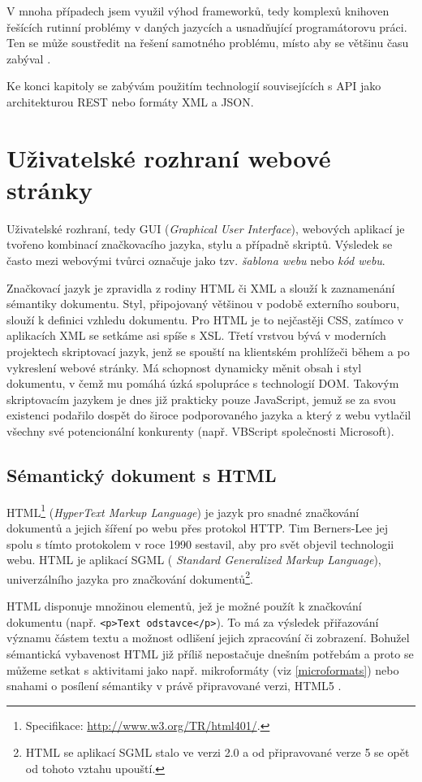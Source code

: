 V mnoha případech jsem využil výhod frameworků, tedy komplexů
knihoven řešících rutinní problémy v daných jazycích a usnadňující
programátorovu práci. Ten se může soustředit na řešení samotného
problému, místo aby se většinu času zabýval .

Ke konci kapitoly se zabývám použitím technologií souvisejících s API
jako architekturou REST nebo formáty XML a JSON.

\section{Uživatelské rozhraní webové stránky}\label{gui}
Uživatelské rozhraní, tedy GUI ({\it Graphical User Interface}),
webových aplikací je tvořeno kombinací značkovacího jazyka, stylu a
případně skriptů. Výsledek se často mezi webovými tvůrci označuje
jako tzv. {\it šablona webu} nebo {\it kód webu}.

Značkovací jazyk je zpravidla z rodiny HTML či XML a slouží k
zaznamenání sémantiky dokumentu. Styl, připojovaný většinou v podobě
externího souboru, slouží k definici vzhledu dokumentu. Pro HTML je
to nejčastěji CSS, zatímco v aplikacích XML se setkáme asi spíše s
XSL. Třetí vrstvou bývá v  moderních projektech skriptovací
jazyk, jenž se spouští na klientském prohlížeči během a po vykreslení
webové stránky. Má schopnost dynamicky měnit obsah i styl dokumentu, v
čemž mu pomáhá úzká spolupráce s technologií DOM. Takovým skriptovacím
jazykem je dnes již prakticky pouze JavaScript, jemuž se za svou
existenci podařilo dospět do široce podporovaného jazyka a který z
webu vytlačil všechny své potencionální konkurenty (např. VBScript
společnosti Microsoft).

\subsection{Sémantický dokument s HTML}
HTML\footnote{Specifikace: \url{http://www.w3.org/TR/html401/}.}
({\it HyperText Markup Language}) je jazyk pro snadné značkování dokumentů a jejich šíření po webu přes protokol HTTP. Tim
Berners-Lee jej spolu s tímto protokolem v roce 1990 sestavil, aby
pro svět objevil technologii webu. HTML je aplikací SGML ({\it
Standard Generalized Markup Language}), univerzálního jazyka pro značkování
dokumentů\footnote{HTML se aplikací SGML stalo ve verzi 2.0 a od
připravované verze 5 se opět od tohoto vztahu upouští.}.
\cite{htmlHistory}

HTML disponuje množinou elementů, jež je možné použít k značkování
dokumentu (např. {\tt <p>Text odstavce</p>}). To má za výsledek
přiřazování významu částem textu a možnost odlišení jejich zpracování
či zobrazení. Bohužel sémantická vybavenost HTML již příliš
nepostačuje dnešním potřebám a proto se můžeme setkat s aktivitami
jako např. mikroformáty (viz \ref{microformats}) nebo snahami o
posílení sémantiky v právě připravované verzi, HTML5 \cite{html5}.


